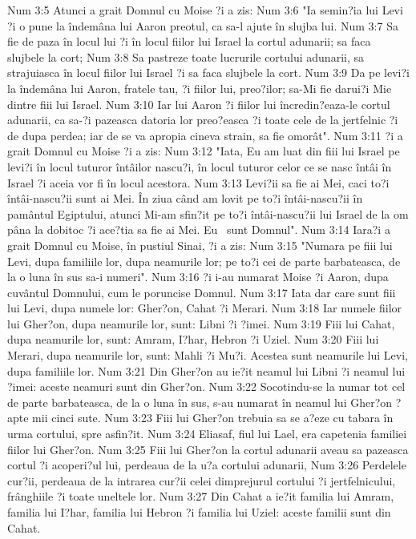 Num 3:5  Atunci a grait Domnul cu Moise ?i a zis:
Num 3:6  "Ia semin?ia lui Levi ?i o pune la îndemâna lui Aaron preotul, ca sa-l ajute în slujba lui.
Num 3:7  Sa fie de paza în locul lui ?i în locul fiilor lui Israel la cortul adunarii; sa faca slujbele la cort;
Num 3:8  Sa pastreze toate lucrurile cortului adunarii, sa strajuiasca în locul fiilor lui Israel ?i sa faca slujbele la cort.
Num 3:9  Da pe levi?i la îndemâna lui Aaron, fratele tau, ?i fiilor lui, preo?ilor; sa-Mi fie darui?i Mie dintre fiii lui Israel.
Num 3:10  Iar lui Aaron ?i fiilor lui încredin?eaza-le cortul adunarii, ca sa-?i pazeasca datoria lor preo?easca ?i toate cele de la jertfelnic ?i de dupa perdea; iar de se va apropia cineva strain, sa fie omorât".
Num 3:11  ?i a grait Domnul cu Moise ?i a zis:
Num 3:12  "Iata, Eu am luat din fiii lui Israel pe levi?i în locul tuturor întâilor nascu?i, în locul tuturor celor ce se nasc întâi în Israel ?i aceia vor fi în locul acestora.
Num 3:13  Levi?ii sa fie ai Mei, caci to?i întâi-nascu?ii sunt ai Mei. În ziua când am lovit pe to?i întâi-nascu?ii în pamântul Egiptului, atunci Mi-am sfin?it pe to?i întâi-nascu?ii lui Israel de la om pâna la dobitoc ?i ace?tia sa fie ai Mei. Eu  sunt Domnul".
Num 3:14  Iara?i a grait Domnul cu Moise, în pustiul Sinai, ?i a zis:
Num 3:15  "Numara pe fiii lui Levi, dupa familiile lor, dupa neamurile lor; pe to?i cei de parte barbateasca, de la o luna în sus sa-i numeri".
Num 3:16  ?i i-au numarat Moise ?i Aaron, dupa cuvântul Domnului, cum le poruncise Domnul.
Num 3:17  Iata dar care sunt fiii lui Levi, dupa numele lor: Gher?on, Cahat ?i Merari.
Num 3:18  Iar numele fiilor lui Gher?on, dupa neamurile lor, sunt: Libni ?i ?imei.
Num 3:19  Fiii lui Cahat, dupa neamurile lor, sunt: Amram, I?har, Hebron ?i Uziel.
Num 3:20  Fiii lui Merari, dupa neamurile lor, sunt: Mahli ?i Mu?i. Acestea sunt neamurile lui Levi, dupa familiile lor.
Num 3:21  Din Gher?on au ie?it neamul lui Libni ?i neamul lui ?imei: aceste neamuri sunt din Gher?on.
Num 3:22  Socotindu-se la numar tot cel de parte barbateasca, de la o luna în sus, s-au numarat în neamul lui Gher?on ?apte mii cinci sute.
Num 3:23  Fiii lui Gher?on trebuia sa se a?eze cu tabara în urma cortului, spre asfin?it.
Num 3:24  Eliasaf, fiul lui Lael, era capetenia familiei fiilor lui Gher?on.
Num 3:25  Fiii lui Gher?on la cortul adunarii aveau sa pazeasca cortul ?i acoperi?ul lui, perdeaua de la u?a cortului adunarii,
Num 3:26  Perdelele cur?ii, perdeaua de la intrarea cur?ii celei dimprejurul cortului ?i jertfelnicului, frânghiile ?i toate uneltele lor.
Num 3:27  Din Cahat a ie?it familia lui Amram, familia lui I?har, familia lui Hebron ?i familia lui Uziel: aceste familii sunt din Cahat.
